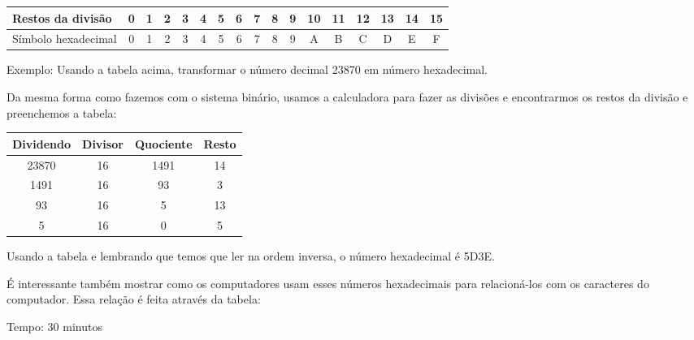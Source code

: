\documentclass[12pt, openright, a4paper, brazil, openany, oneside]{abntex2}
\begin{document}
\begin{table}[h]
        \centering
        \begin{tabular}{|l|c|c|c|c|c|c|c|c|c|c|c|c|c|c|c|c|}
            \hline
            Restos da divisão & 0 & 1 & 2 & 3 & 4 & 5 & 6 & 7 & 8 & 9 & 10 & 11 & 12 & 13 & 14 & 15 \\
            \hline
            Símbolo hexadecimal & 0 & 1 & 2 & 3 & 4 & 5 & 6 & 7 & 8 & 9 & A & B & C & D & E & F \\
            \hline
        \end{tabular}
    \end{table}

Exemplo: Usando a tabela acima, transformar o número decimal 23870 em número hexadecimal.

Da mesma forma como fazemos com o sistema binário, usamos a calculadora para fazer as divisões e encontrarmos os restos da divisão e preenchemos a tabela:

 \begin{table}[h]
        \centering
        \begin{tabular}{|c|c|c|c|}
            \hline
            Dividendo & Divisor & Quociente & Resto \\
            \hline
            23870 & 16 & 1491 & 14 \\
            \hline
            1491 & 16 & 93 & 3 \\
            \hline
            93 & 16 & 5 & 13 \\
            \hline
            5 & 16 & 0 & 5 \\
            \hline
        \end{tabular}
    \end{table}

Usando a tabela e lembrando que temos que ler na ordem inversa, o número hexadecimal é 5D3E.


É interessante também mostrar como os computadores usam esses números hexadecimais para relacioná-los com os caracteres do computador. Essa relação é feita através da tabela:

\begin{figure}[h]

    \center


\end{figure}


Tempo: 30 minutos
\end{document}
